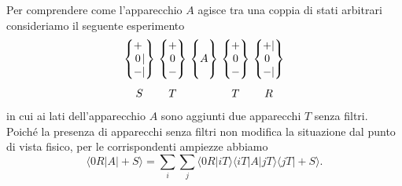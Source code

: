 \documentclass[a4paper,12pt,oneside]{book}
\begin{document}
Per comprendere come l'apparecchio $A$ agisce tra una coppia di stati arbitrari consideriamo il seguente esperimento
\begin{equation}
		\begin{matrix}
		\begin{Bmatrix}
 			\makebox[\widthof{$-$}]{$+$}\makebox[\widthof{$|$}]{$\ $} \\ \makebox[\widthof{$-$}]{$0$}|\\ - | 
		\end{Bmatrix} \\[0.7cm]
			S
		\end{matrix} \
		\begin{matrix}
		\begin{Bmatrix}
 			+ \\ 0 \\ -
		\end{Bmatrix} \\[0.7cm]
			T
		\end{matrix} \		
		\begin{matrix}
		\begin{Bmatrix}
			 \makebox[\widthof{$A$}]{$\ $}\\ A \\ \makebox[\widthof{$A$}]{$\ $} 
		\end{Bmatrix}  \\[0.7cm]
			\
		\end{matrix}\
		\begin{matrix}
		\begin{Bmatrix}
 			+ \\ 0 \\ -
		\end{Bmatrix} \\[0.7cm]
			T
		\end{matrix} \
		\begin{matrix}
		\begin{Bmatrix}
			\makebox[\widthof{$-$}]{$+$} | \\ \makebox[\widthof{$-$}]{$0$}\makebox[\widthof{$|$}]{$\ $}\\ - | 
		\end{Bmatrix} \\[0.7cm]
			R
		\end{matrix}
	\end{equation}
in cui ai lati dell'apparecchio $A$ sono aggiunti due apparecchi $T$ senza filtri. Poiché la presenza di apparecchi senza filtri non modifica la situazione dal punto di vista fisico, per le corrispondenti ampiezze abbiamo
	\begin{equation}
		\langle 0R|A| +S \rangle = \sum \limits_{i} \sum \limits_{j} \langle 0R | iT \rangle \langle iT | A | jT \rangle \langle jT | +S \rangle .
	\end{equation}
\end{document}
